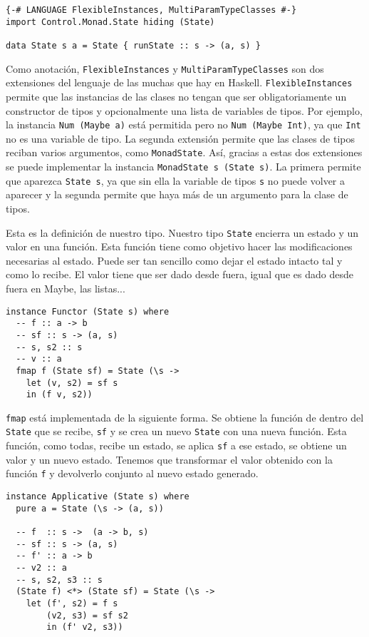 \documentclass[class=article, crop=false]{standalone}
\begin{document}
\begin{verbatim}
{-# LANGUAGE FlexibleInstances, MultiParamTypeClasses #-}
import Control.Monad.State hiding (State)

data State s a = State { runState :: s -> (a, s) }
\end{verbatim}

Como anotación, \verb`FlexibleInstances` y \verb`MultiParamTypeClasses` son dos extensiones
del lenguaje de las muchas que hay en Haskell. \verb`FlexibleInstances` permite que las
instancias de las clases no tengan que ser obligatoriamente un constructor de tipos y
opcionalmente una lista de variables de tipos. Por ejemplo, la instancia \verb`Num (Maybe a)`
está permitida pero no \verb`Num (Maybe Int)`, ya que \verb`Int` no es una variable de tipo.
La segunda extensión permite que las clases de tipos reciban varios argumentos, como
\verb`MonadState`. Así, gracias a estas dos extensiones se puede implementar la instancia
\verb`MonadState s (State s)`. La primera permite que aparezca \verb`State s`, ya que sin
ella la variable de tipos \verb`s` no puede volver a aparecer y la segunda permite que haya
más de un argumento para la clase de tipos.

Esta es la definición de nuestro tipo. Nuestro tipo \verb`State` encierra un estado y un
valor en una función. Esta función tiene como objetivo hacer las modificaciones necesarias al
estado. Puede ser tan sencillo como dejar el estado intacto tal y como lo recibe. El valor
tiene que ser dado desde fuera, igual que es dado desde fuera en Maybe, las listas...

\begin{verbatim}
instance Functor (State s) where
  -- f :: a -> b
  -- sf :: s -> (a, s)
  -- s, s2 :: s
  -- v :: a
  fmap f (State sf) = State (\s ->
    let (v, s2) = sf s
    in (f v, s2))
\end{verbatim}

\verb`fmap` está implementada de la siguiente forma. Se obtiene la función de dentro del
\verb`State` que se recibe, \verb`sf` y se crea un nuevo \verb`State` con una nueva función.
Esta función, como todas, recibe un estado, se aplica \verb`sf` a ese estado, se obtiene un
valor y un nuevo estado. Tenemos que transformar el valor obtenido con la función \verb`f` y
devolverlo conjunto al nuevo estado generado.

\begin{verbatim}
instance Applicative (State s) where
  pure a = State (\s -> (a, s))

  -- f  :: s ->  (a -> b, s)
  -- sf :: s -> (a, s)
  -- f' :: a -> b
  -- v2 :: a
  -- s, s2, s3 :: s
  (State f) <*> (State sf) = State (\s ->
    let (f', s2) = f s
        (v2, s3) = sf s2
        in (f' v2, s3))
\end{verbatim}
\end{document}
